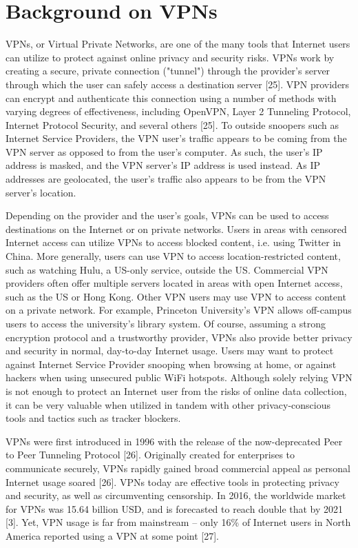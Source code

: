 \section{Background on VPNs}\label{sec:background}
VPNs, or Virtual Private Networks, are one of the many tools that Internet
users can utilize to protect against online privacy and security risks. VPNs
work by creating a secure, private connection ("tunnel") through the
provider's server through which the user can safely access a destination
server [25]. VPN providers can encrypt and authenticate this connection using
a number of methods with varying degrees of effectiveness, including OpenVPN,
Layer 2 Tunneling Protocol, Internet Protocol Security, and several others
[25]. To outside snoopers such as Internet Service Providers, the VPN user's
traffic appears to be coming from the VPN server as opposed to from the user's
computer. As such, the user's IP address is masked, and the VPN server's IP
address is used instead. As IP addresses are geolocated, the user's traffic
also appears to be from the VPN server's location.

Depending on the provider and the user's goals, VPNs can be used to access
destinations on the Internet or on private networks. Users in areas with
censored Internet access can utilize VPNs to access blocked content, i.e.
using Twitter in China. More generally, users can use VPN to access
location-restricted content, such as watching Hulu, a US-only service, outside
the US. Commercial VPN providers often offer multiple servers located in areas
with open Internet access, such as the US or Hong Kong. Other VPN users may
use VPN to access content on a private network. For example, Princeton
University's VPN allows off-campus users to access the university's library
system. Of course, assuming a strong encryption protocol and a trustworthy
provider, VPNs also provide better privacy and security in normal, day-to-day
Internet usage. Users may want to protect against Internet Service Provider
snooping when browsing at home, or against hackers when using unsecured public
WiFi hotspots. Although solely relying VPN is not enough to protect an
Internet user from the risks of online data collection, it can be very
valuable when utilized in tandem with other privacy-conscious tools and
tactics such as tracker blockers.

VPNs were first introduced in 1996 with the release of the now-deprecated Peer
to Peer Tunneling Protocol [26]. Originally created for enterprises to
communicate securely, VPNs rapidly gained broad commercial appeal as personal
Internet usage soared [26]. VPNs today are effective tools in protecting
privacy and security, as well as circumventing censorship. In 2016, the
worldwide market for VPNs was 15.64 billion USD, and is forecasted to reach
double that by 2021 [3]. Yet, VPN usage is far from mainstream -- only 16\% of
Internet users in North America reported using a VPN at some point [27].
